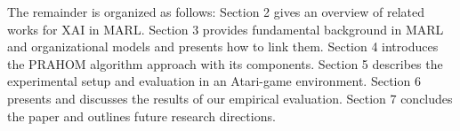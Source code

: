 \documentclass{ecai}
\newtheorem{theorem}{Theorem}
\newcounter{proof}
\renewcommand{\theproof}{\arabic{proof}}
\renewenvironment{proof}[1][]{
    \refstepcounter{proof}
    \noindent \raggedright \textit{\textbf{Proof. \theproof}}

    \setlength{\leftskip}{1em}

}
{

\
\setlength{\leftskip}{0pt}
}
\begin{document}

The remainder is organized as follows: Section 2 gives an overview of related works for XAI in MARL. Section 3 provides fundamental background in MARL and organizational models and presents how to link them. Section 4 introduces the PRAHOM algorithm approach with its components. Section 5 describes the experimental setup and evaluation in an Atari-game environment. Section 6 presents and discusses the results of our empirical evaluation. Section 7 concludes the paper and outlines future research directions.





\end{document}
